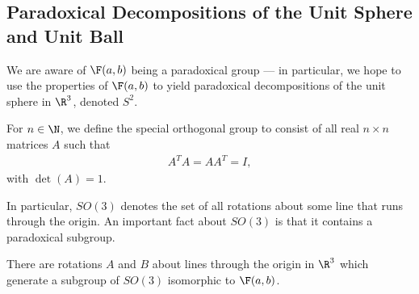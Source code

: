 \documentclass[10pt]{mypackage}
\begin{document}
\subsection{Paradoxical Decompositions of the Unit Sphere and Unit Ball}%
We are aware of $\F(a,b)$ being a paradoxical group --- in particular, we hope to use the properties of $\F(a,b)$ to yield paradoxical decompositions of the unit sphere in $\R^{3}$, denoted $S^{2}$.
\begin{definition}
  For $n\in \N$, we define the special orthogonal group to consist of all real $n\times n$ matrices $A$ such that
  \begin{align*}
    A^{T}A = AA^{T} = I,
  \end{align*}
  with $\det(A) = 1$.
\end{definition}
In particular, $SO(3)$ denotes the set of all rotations about some line that runs through the origin. An important fact about $SO(3)$ is that it contains a paradoxical subgroup.
\begin{theorem}
  There are rotations $A$ and $B$ about lines through the origin in $\R^3$ which generate a subgroup of $SO(3)$ isomorphic to $\F(a,b)$.
\end{theorem}
\end{document}
